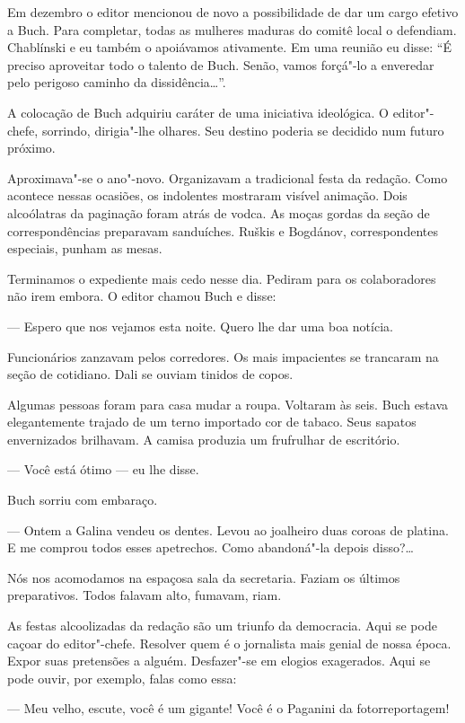 Em dezembro o editor mencionou de novo a possibilidade de dar um cargo
efetivo a Buch. Para completar, todas as mulheres maduras do comitê
local o defendiam. Chablínski e eu também o apoiávamos ativamente. Em
uma reunião eu disse: ``É preciso aproveitar todo o talento de Buch.
Senão, vamos forçá"-lo a enveredar pelo perigoso caminho da
dissidência\ldots{}''.

A colocação de Buch adquiriu caráter de uma iniciativa ideológica. O
editor"-chefe, sorrindo, dirigia"-lhe olhares. Seu destino poderia se
decidido num futuro próximo.

Aproximava"-se o ano"-novo. Organizavam a tradicional festa da redação.
Como acontece nessas ocasiões, os indolentes mostraram visível animação.
Dois alcoólatras da paginação foram atrás de vodca. As moças gordas da
seção de correspondências preparavam sanduíches. Ruškis e Bogdánov,
correspondentes especiais, punham as mesas.

Terminamos o expediente mais cedo nesse dia. Pediram para os
colaboradores não irem embora. O editor chamou Buch e disse:

--- Espero que nos vejamos esta noite. Quero lhe dar uma boa notícia.

Funcionários zanzavam pelos corredores. Os mais impacientes se trancaram
na seção de cotidiano. Dali se ouviam tinidos de copos.

Algumas pessoas foram para casa mudar a roupa. Voltaram às seis. Buch
estava elegantemente trajado de um terno importado cor de tabaco. Seus
sapatos envernizados brilhavam. A camisa produzia um frufrulhar de
escritório.

--- Você está ótimo --- eu lhe disse.

Buch sorriu com embaraço.

--- Ontem a Galina vendeu os dentes. Levou ao joalheiro duas coroas de
platina. E me comprou todos esses apetrechos. Como abandoná"-la depois
disso?\ldots{}

Nós nos acomodamos na espaçosa sala da secretaria. Faziam os últimos
preparativos. Todos falavam alto, fumavam, riam.

As festas alcoolizadas da redação são um triunfo da democracia. Aqui se
pode caçoar do editor"-chefe. Resolver quem é o jornalista mais genial de
nossa época. Expor suas pretensões a alguém. Desfazer"-se em elogios
exagerados. Aqui se pode ouvir, por exemplo, falas como essa:

--- Meu velho, escute, você é um gigante! Você é o Paganini da
fotorreportagem!

